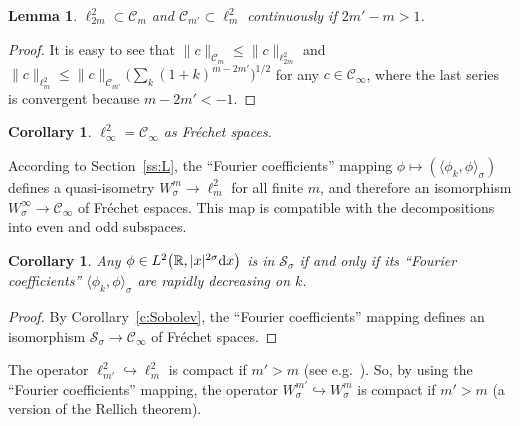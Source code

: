 \documentclass[11pt]{article}
\newtheorem{Corollary}[Theorem]{Corollary}
\newtheorem{Lemma}[Theorem]{Lemma}
\newcommand{\R}{\mathbb{R}}
\newcommand{\CC}{\mathcal{C}}
\renewcommand{\SS}{\mathcal{S}}
\begin{document}
\begin{Lemma}\label{l:ell 2 2m subset CC m}
  $\ell^2_{2m}\subset\CC_m$ and $\CC_{m'}\subset\ell^2_m$ continuously if $2m'-m>1$.
\end{Lemma}

\begin{proof}
  It is easy to see that $\|c\|_{\CC_m}\le\|c\|_{\ell^2_{2m}}$ and $ \|c\|_{\ell^2_m}\le\|c\|_{\CC_{m'}}\big(\sum_k(1+k)^{m-2m'}\big)^{1/2}$ for any $c\in\CC_\infty$, where the last series is convergent because $m-2m'<-1$.
\end{proof}

\begin{Corollary}\label{c:ell 2 infty=CC}
  $\ell^2_\infty=\CC_\infty$ as Fr\'echet spaces.
\end{Corollary}

According to Section~\ref{ss:L}, the ``Fourier coef\/f\/icients'' mapping $\phi\mapsto(\langle\phi_k,\phi\rangle_\sigma)$ def\/ines a quasi-isometry $W_\sigma^m\to\ell^2_m$ for all f\/inite $m$, and therefore an isomorphism $W_\sigma^\infty\to\CC_\infty$ of Fr\'echet espaces. This map is compatible with the decompositions into even and odd subspaces.

\begin{Corollary}\label{c:SS_sigma, rapidly degreasing Fourier coefficients}
  Any $\phi\in L^2\big(\R,|x|^{2\sigma}{\rm d}x\big)$ is in $\SS_\sigma$ if and only if its ``Fourier coefficients'' $\langle\phi_k,\phi\rangle_\sigma$ are rapidly decreasing on $k$.
\end{Corollary}

\begin{proof}
  By Corollary~\ref{c:Sobolev}, the ``Fourier coef\/f\/icients'' mapping def\/ines an isomorphism $\SS_\sigma\to\CC_\infty$ of Fr\'echet spaces.
\end{proof}

The operator $\ell^2_{m'}\hookrightarrow\ell^2_m$ is compact if $m'>m$ (see e.g.\ \cite[Theorem 5.8]{Roe1998}). So, by using  the ``Fourier coef\/f\/icients'' mapping, the operator $W_\sigma^{m'}\hookrightarrow W_\sigma^m$ is compact if $m'>m$ (a version of the Rellich theorem).
\end{document}
